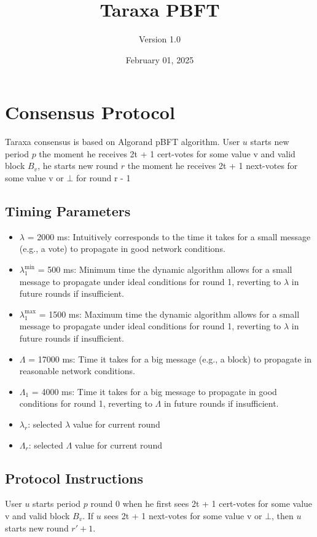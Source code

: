 \documentclass{article}
\title{Taraxa PBFT}
\author{Version 1.0}
\date{February 01, 2025}
\begin{document}
    \maketitle

    \tableofcontents

    \section{Consensus Protocol}
    Taraxa consensus is based on Algorand pBFT algorithm.
    User $u$ starts new period $p$ the moment he receives 2t + 1 cert-votes for some value v and valid block $B_v$,
    he starts new round $r$ the moment he receives 2t + 1 next-votes for some value v or $\bot$ for round r - 1

    \subsection{Timing Parameters}
    \begin{itemize}
        \item $\lambda$ = 2000 ms: Intuitively corresponds to the time it takes for a small message (e.g., a vote) to propagate in good network conditions.
        \item $\lambda_1^{\text{min}}$ = 500 ms: Minimum time the dynamic algorithm allows for a small message to propagate under ideal conditions for round 1, reverting to $\lambda$ in future rounds if insufficient.
        \item $\lambda_1^{\text{max}}$ = 1500 ms: Maximum time the dynamic algorithm allows for a small message to propagate under ideal conditions for round 1, reverting to $\lambda$ in future rounds if insufficient.
        \item $\Lambda$ = 17000 ms: Time it takes for a big message (e.g., a block) to propagate in reasonable network conditions.
        \item $\Lambda_1$ = 4000 ms: Time it takes for a big message to propagate in good conditions for round 1, reverting to $\Lambda$ in future rounds if insufficient.
        \item $\lambda_r$: selected $\lambda$ value for current round
        \item $\Lambda_r$: selected $\Lambda$ value for current round
    \end{itemize}

    \subsection{Protocol Instructions}
    User $u$ starts period $p$ round 0 when he first sees 2t + 1 cert-votes for some value v and valid block $B_v$. If $u$ sees 2t + 1 next-votes for some value v or $\bot$, then $u$ starts new round $r' + 1$.
\end{document}
